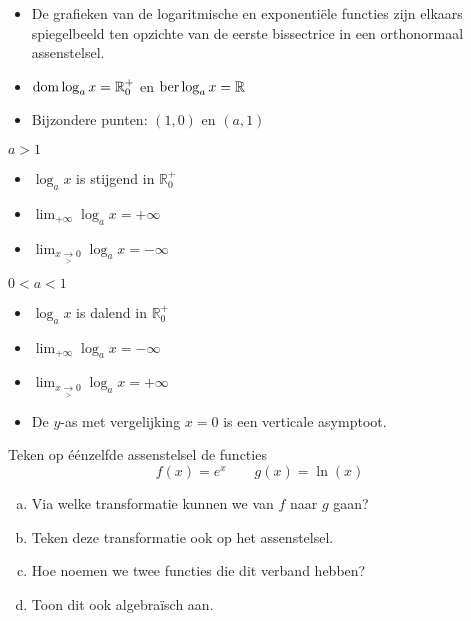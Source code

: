 \documentclass[12pt,twoside]{article}
\begin{document}
\begin{itemize}
  \item De grafieken van de logaritmische en exponentiële functies zijn elkaars spiegelbeeld ten opzichte van de eerste bissectrice in een orthonormaal assenstelsel.
  \item $\dom \log_a x = \mathbb{R}^+_0$ en $\ber \log_a x = \mathbb{R}$
  \item Bijzondere punten: $(1, 0)$ en $(a, 1)$\\
\end{itemize}
  \begin{minipage}{0.5\textwidth}
    \centering $a>1$
    \begin{itemize}
      \item $\log_a x$ is stijgend in $\mathbb{R}^+_0$
      \item $\lim_{+\infty} \log_a x = +\infty$
      \item $\lim_{x\underset{>}{\to}0} \log_a x = -\infty$
    \end{itemize}
  \end{minipage}\vline
  \begin{minipage}{0.5\textwidth}
    \centering $0<a<1$
    \begin{itemize}
      \item $\log_a x$ is dalend in $\mathbb{R}^+_0$
      \item $\lim_{+\infty} \log_a x = -\infty$
      \item $\lim_{x\underset{>}{\to}0} \log_a x = +\infty$
    \end{itemize}
  \end{minipage}
  \begin{itemize}
    \item De $y$-as met vergelijking $x=0$ is een verticale asymptoot.
  \end{itemize}

\begin{oefening}
Teken op éénzelfde assenstelsel de functies
$$f(x)=e^x\qquad g(x)=\ln(x)$$
\begin{enumerate}[(a)]
  \item Via welke transformatie kunnen we van $f$ naar $g$ gaan?
  \item Teken deze transformatie ook op het assenstelsel.
  \item Hoe noemen we twee functies die dit verband hebben?
  \item Toon dit ook algebraïsch aan.
\end{enumerate}
\end{oefening}
\end{document}
